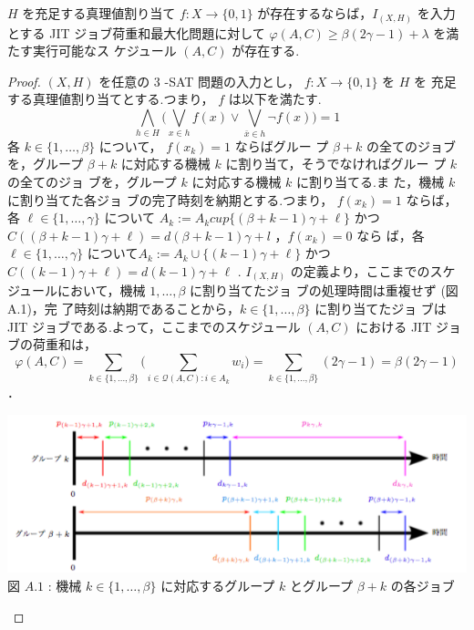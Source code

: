 \documentclass[12pt]{optlab-bachelor}
\begin{document}
\begin{lemma}\label{l_1}
  $H$ を充足する真理値割り当て $f : X \to \{0,1\}$ が存在するならば，$I_{(X,H)}$ を入力とする JIT ジョブ荷重和最大化問題に対して
  $\varphi(A, C) \ge \beta(2\gamma - 1) + \lambda$ を満たす実行可能なス
  ケジュール $(A, C)$ が存在する.
\end{lemma}

\begin{proof}
  $(X,H)$ を任意の 3 -SAT 問題の入力とし， $f : X \to \{0,1\}$ を $H$ を
  充足する真理値割り当てとする.つまり， $f$ は以下を満たす.
  $$\displaystyle \bigwedge_{h \in H} \bigg(\bigvee_{x \in h}f(x) \lor
  \bigvee_{\bar x \in h}\lnot f(x) \bigg) = 1$$
  各 $k \in \{1,\ldots, \beta\}$ について， $f(x_k) = 1$ ならばグルー
  プ $\beta + k$ の全てのジョブを，グループ $\beta + k$ に対応する機械
  $k$ に割り当て，そうでなければグルー
  プ $k$ の全てのジョ ブを，グループ $k$ に対応する機械 $k$ に割り当てる.ま
  た，機械 $k$ に割り当てた各ジョ ブの完了時刻を納期とする.つまり，
  $f(x_k) = 1$ ならば，各 $\ell \in \{1,\ldots,\gamma\}$ について $A_k
  :=A_k cup\{(\beta+k−1)\gamma+\ell\}$ かつ
  $C((\beta+k−1)\gamma+\ell)=d(\beta+k−1)\gamma+l$ ，$f(x_k)=0$ なら
  ば，各 $\ell \in \{1,\ldots,\gamma \}$ について$A_k :=A_k \cup
  \{(k−1)\gamma+\ell \}$ かつ $C((k−1)\gamma+\ell)=d(k−1)\gamma+\ell$
  . $I_{(X,H)}$ の定義より，ここまでのスケジュールにおいて，機械
  $1,\ldots, \beta$ に割り当てたジョ ブの処理時間は重複せず (図 A.1)，完
  了時刻は納期であることから，$k \in \{1,\ldots,\beta\}$ に割り当てたジョ
  ブは JIT ジョブである.よって，ここまでのスケジュール $(A, C)$ における
  JIT ジョブの荷重和は，
  $$\displaystyle \varphi(A,C) = \sum_{k \in
  \{1,\ldots,\beta\}}\bigg(\sum_{i \in \mathcal{Q}(A,C):i \in
  A_k}w_i\bigg) = \sum_{k \in \{1,\ldots,\beta\}}(2\gamma - 1) =
  \beta(2\gamma - 1)$$．
  \begin{center}
    \includegraphics[width = 15cm]{SJIT1.png} \\
    図 $A.1$ : 機械 $k \in \{1,\ldots,\beta\}$ に対応するグループ $k$
    とグループ $\beta + k$ の各ジョブ
  \end{center}

\end{proof}
\end{document}
